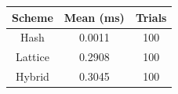 \begin{tabular}{ccc}
\hline
Scheme & Mean (ms) & Trials \\
\hline
Hash & 0.0011 & 100 \\
Lattice & 0.2908 & 100 \\
Hybrid & 0.3045 & 100 \\
\hline
\end{tabular}
